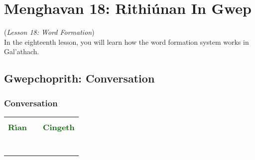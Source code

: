 \section{Menghavan 18: Rithi\'{u}nan In Gwep}
(\textit{Lesson 18: Word Formation})\\

In the eighteenth lesson, you will learn how the word formation system works in Gal'{a}thach.

\subsection{Gwepchoprith: Conversation}
\subsubsection{Conversation}

\begin{table}[H]
\centering
    \begin{tabular}{cM{10.0cm}c}
     &  & \\
    \textcolor{darkgreen}{\textbf{R\'{\i}an}} &  & \textcolor{darkgreen}{\textbf{Cingeth}}\\
     &  & \\
     &  & \\
     &  & \\
     &  & \\
     &  & \\
     &  & \\
     &  & 
    \end{tabular}
\end{table}


